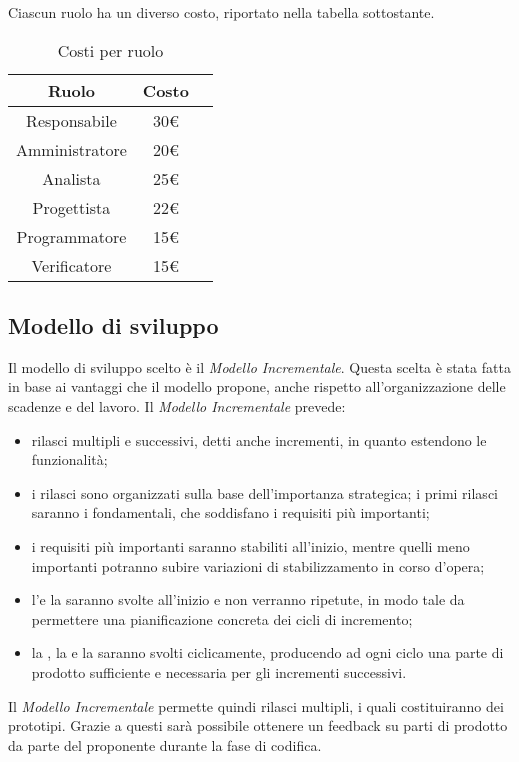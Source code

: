 Ciascun ruolo ha un diverso costo, riportato nella tabella sottostante.
\begin{table}[H]
	\centering
	\begin{tabular}{|c|c|c|}
		\hline
		\textbf{Ruolo} &
		\textbf{Costo}\\
		\hline
		Responsabile & 30€  \\
		\hline
		Amministratore &  20€ \\
		\hline
		Analista & 25€  \\
		\hline
		Progettista & 22€  \\
		\hline 
		Programmatore & 15€  \\
		\hline
		Verificatore &  15€ \\
		\hline
	\end{tabular}
	\caption{Costi per ruolo}
\end{table}

\subsection{Modello di sviluppo}
Il modello di sviluppo scelto è il \textit{Modello Incrementale}. Questa scelta è stata fatta in base ai vantaggi che il modello propone, anche rispetto all’organizzazione delle scadenze e del lavoro.
Il \textit{Modello Incrementale} prevede:
\begin{itemize}
	\item rilasci multipli e successivi, detti anche incrementi, in quanto estendono le funzionalità;
	\item i rilasci sono organizzati sulla base dell’importanza strategica; i primi rilasci saranno i fondamentali, che soddisfano i requisiti più importanti;
	\item i requisiti più importanti saranno stabiliti all’inizio, mentre quelli meno importanti potranno subire variazioni di stabilizzamento in corso d’opera;
	\item l’\AR e la \PA saranno svolte all’inizio e non verranno ripetute, in modo tale da permettere una pianificazione concreta dei cicli di incremento;
	\item la \PD, la \Cod e la \VV saranno svolti ciclicamente, producendo ad ogni ciclo una parte di prodotto sufficiente e necessaria per gli incrementi successivi.
\end{itemize}
Il \textit{Modello Incrementale} permette quindi rilasci multipli, i quali costituiranno dei prototipi. Grazie a questi sarà possibile ottenere un feedback su parti di prodotto da parte del proponente durante la fase di codifica.


